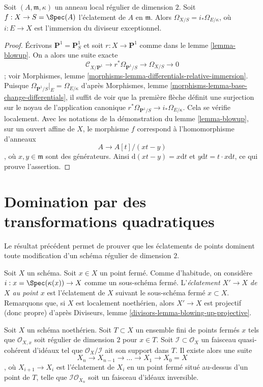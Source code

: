 \begin{lemma} \label{lemma-differentials-of-blowup} Soit $(A, \mathfrak m, \kappa)$ un anneau local régulier de dimension $2$. Soit $f : X \to S = \Spec(A)$ l'éclatement de $A$ en $\mathfrak m$. Alors $\Omega_{X/S} = i_*\Omega_{E/\kappa}$, où $i : E \to X$ est l'immersion du diviseur exceptionnel. \end{lemma}

\begin{proof} Écrivons $\mathbf{P}^1 = \mathbf{P}^1_S$ et soit $r : X \to \mathbf{P}^1$ comme dans le lemme \ref{lemma-blowup}. On a alors une suite exacte $$
\mathcal{C}_{X/\mathbf{P}^1} \to r^*\Omega_{\mathbf{P}^1/S} \to
\Omega_{X/S} \to 0
$$ ; voir Morphismes, lemme \ref{morphisms-lemma-differentials-relative-immersion}. Puisque $\Omega_{\mathbf{P}^1/S}|_E = \Omega_{E/\kappa}$ d'après Morphismes, lemme \ref{morphisms-lemma-base-change-differentials}, il suffit de voir que la première flèche définit une surjection sur le noyau de l'application canonique $r^*\Omega_{\mathbf{P}^1/S} \to i_*\Omega_{E/\kappa}$. Cela se vérifie localement. Avec les notations de la démonstration du lemme \ref{lemma-blowup}, sur un ouvert affine de $X$, le morphisme $f$ correspond à l'homomorphisme d'anneaux $$
A \to A[t]/(xt - y)
$$, où $x, y \in \mathfrak m$ sont des générateurs. Ainsi $\text{d}(xt - y) = x\text{d}t$ et $y\text{d}t = t \cdot x \text{d}t$, ce qui prouve l'assertion. \end{proof}



\section{Domination par des transformations quadratiques} \label{section-dominating-by-quadratic}

\noindent Le résultat précédent permet de prouver que les éclatements de points dominent toute modification d'un schéma régulier de dimension $2$.

\medskip\noindent Soit $X$ un schéma. Soit $x \in X$ un point fermé. Comme d'habitude, on considère $i : x = \Spec(\kappa(x)) \to X$ comme un sous-schéma fermé. L'{\it éclatement $X' \to X$ de $X$ au point $x$} est l'éclatement de $X$ suivant le sous-schéma fermé $x \subset X$. Remarquons que, si $X$ est localement noethérien, alors $X' \to X$ est projectif (donc propre) d'après Diviseurs, lemme \ref{divisors-lemma-blowing-up-projective}.

\begin{lemma} \label{lemma-make-ideal-principal} Soit $X$ un schéma noethérien. Soit $T \subset X$ un ensemble fini de points fermés $x$ tels que $\mathcal{O}_{X, x}$ soit régulier de dimension $2$ pour $x \in T$. Soit $\mathcal{I} \subset \mathcal{O}_X$ un faisceau quasi-cohérent d'idéaux tel que $\mathcal{O}_X/\mathcal{I}$ ait son support dans $T$. Il existe alors une suite $$
X_n \to X_{n - 1} \to \ldots \to X_1 \to X_0 = X
$$, où $X_{i + 1} \to X_i$ est l'éclatement de $X_i$ en un point fermé situé au-dessus d'un point de $T$, telle que $\mathcal{I}\mathcal{O}_{X_n}$ soit un faisceau d'idéaux inversible. \end{lemma}

